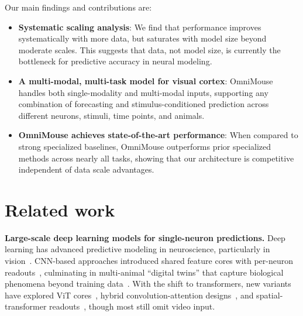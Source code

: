 \documentclass{article} %
\begin{document}
Our main findings and contributions are:
\begin{itemize}[leftmargin=*, itemsep=0pt, topsep=-3pt]
    \item \textbf{Systematic scaling analysis}: We find that performance improves systematically with more data, but saturates with model size beyond moderate scales. This suggests that data, not model size, is currently the bottleneck for predictive accuracy in neural modeling.
    \item \textbf{A multi-modal, multi-task model for visual cortex}: OmniMouse handles both single-modality and multi-modal inputs, supporting any combination of forecasting and stimulus-conditioned prediction across different neurons, stimuli, time points, and animals.
    \item \textbf{OmniMouse achieves state-of-the-art performance}: When compared to strong specialized baselines,
    OmniMouse outperforms prior specialized methods across nearly all tasks, showing that our architecture is competitive independent of data scale advantages.
\end{itemize}
\section{Related work}
\textbf{Large-scale deep learning models for single-neuron predictions.}
Deep learning has advanced predictive modeling in neuroscience, particularly in vision~\citep{Cadieu2014,batty2017multilayer,klindt2017neural,McIntosh2016,Cadena2019,Kindel2017,Walker2019-oq,Zhang2018-cs,Ecker2018,sinz2018stimulus,burg2021learning,Cowley2020neurips}. 
CNN-based approaches introduced shared feature cores with per-neuron readouts~\citep{antolik2016model,klindt2017neural,McIntosh2016,sinz2018stimulus, lurz2020generalization}, culminating in multi-animal ``digital twins'' that capture biological phenomena beyond training data~\citep{ustyuzhaninov2022digital, wang2025foundation}.
With the shift to transformers, new variants have explored ViT cores~\citep{li2023v1t}, hybrid convolution-attention designs~\citep{lin2024incremental,Pierzchlewicz2023-yi}, and spatial-transformer readouts~\citep{saha2024modeling}, though most still omit video input.
\end{document}
